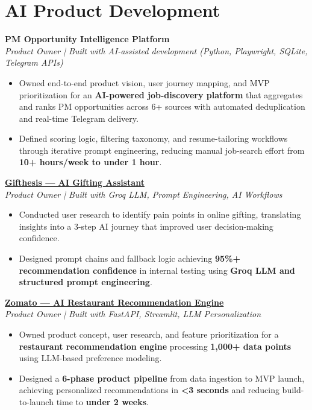 \documentclass[10pt,a4paper]{article}
\begin{document}

\section{AI Product Development}
\textbf{PM Opportunity Intelligence Platform} \\
\textit{Product Owner | Built with AI-assisted development (Python, Playwright, SQLite, Telegram APIs)}
\begin{itemize}
    \item Owned end-to-end product vision, user journey mapping, and MVP prioritization for an \textbf{AI-powered job-discovery platform} that aggregates and ranks PM opportunities across 6+ sources with automated deduplication and real-time Telegram delivery.
    \item Defined scoring logic, filtering taxonomy, and resume-tailoring workflows through iterative prompt engineering, reducing manual job-search effort from \textbf{10+ hours/week to under 1 hour}.
\end{itemize}
\vspace{1pt}

\textbf{\href{https://gifthesis.streamlit.app/}{Gifthesis — AI Gifting Assistant}} \\
\textit{Product Owner | Built with Groq LLM, Prompt Engineering, AI Workflows}
\begin{itemize}
    \item Conducted user research to identify pain points in online gifting, translating insights into a 3-step AI journey that improved user decision-making confidence.
    \item Designed prompt chains and fallback logic achieving \textbf{95\%+ recommendation confidence} in internal testing using \textbf{Groq LLM and structured prompt engineering}.
\end{itemize}
\vspace{1pt}

\textbf{\href{https://zomato-y3yzwtqqszkpmk8jbkecib.streamlit.app/}{Zomato — AI Restaurant Recommendation Engine}} \\
\textit{Product Owner | Built with FastAPI, Streamlit, LLM Personalization}
\begin{itemize}
    \item Owned product concept, user research, and feature prioritization for a \textbf{restaurant recommendation engine} processing \textbf{1,000+ data points} using LLM-based preference modeling.
    \item Designed a \textbf{6-phase product pipeline} from data ingestion to MVP launch, achieving personalized recommendations in \textbf{<3 seconds} and reducing build-to-launch time to \textbf{under 2 weeks}.
\end{itemize}
\vspace{1pt}
\end{document}
